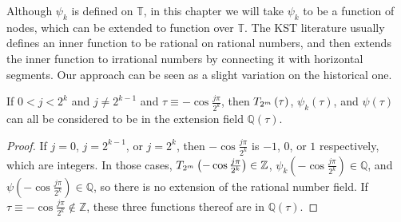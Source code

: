 Although $\psi_k$ is defined on $\mathbb{T}$, in this chapter we will take $\psi_k$ to be a function of nodes, which can be extended to function over $\mathbb{T}$. The KST literature usually defines an inner function to be rational on rational numbers, and then extends the inner function to irrational numbers by connecting it with horizontal segments. Our approach can be seen as a slight variation on the historical one.
\begin{lemma}
  \label{lem:extension}
  If $0 < j < 2^k$ and $j \neq 2^{k - 1}$ and $\tau \equiv -\cos\frac{j\pi}{2^k}$, then $T_{2^{m}}\left(\tau\right)$, $\psi_k\left(\tau\right)$, and $\psi\left(\tau\right)$ can all be considered to be in the extension field $\mathbb{Q}\left(\tau\right)$.
\end{lemma}
\begin{proof}
  If $j = 0$, $j = 2^{k - 1}$, or $j = 2^k$, then $-\cos\frac{j\pi}{2^k}$ is $-1$, $0$, or $1$ respectively, which are integers. In those cases, $T_{2^{m}}\left(-\cos\frac{j\pi}{2^k}\right) \in \mathbb{Z}$, $\psi_k\left(-\cos\frac{j\pi}{2^k}\right) \in \mathbb{Q}$, and $\psi\left(-\cos\frac{j\pi}{2^k}\right) \in \mathbb{Q}$, so there is no extension of the rational number field. If $\tau \equiv -\cos\frac{j\pi}{2^k} \notin \mathbb{Z}$, these three functions thereof are in $\mathbb{Q}\left(\tau\right)$.
\end{proof}

